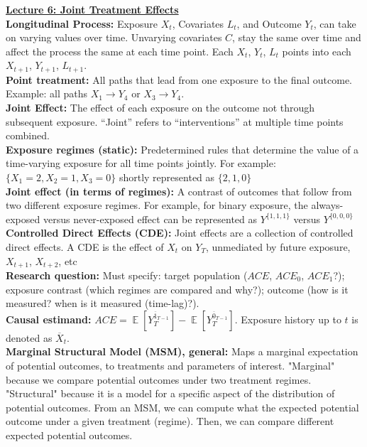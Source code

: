 \documentclass[a4paper,7pt,landscape]{extarticle}
\DeclareMathOperator*{\E}{\mathbb{E}} %
\begin{document}
\begin{multicols}{3}
\begin{boxA}
\underline{\textbf{Lecture 6: Joint Treatment Effects}}\\
\textbf{Longitudinal Process:} Exposure $X_t$, Covariates $L_t$, and Outcome $Y_t$, can take on varying values over time. Unvarying covariates $C$, stay the same over time and affect the process the same at each time point. Each $X_t$, $Y_t$, $L_t$ points into each $X_{t+1}$, $Y_{t+1}$, $L_{t+1}$.\\
\textbf{Point treatment:} All paths that lead from one exposure to the final outcome. Example: all paths $X_1 \rightarrow Y_4$ or $X_3 \rightarrow Y_4$.\\
\textbf{Joint Effect:} The effect of each exposure on the outcome not through subsequent exposure. “Joint” refers to “interventions” at multiple time points combined.\\
\textbf{Exposure regimes (static):} Predetermined rules that determine the value of a time-varying exposure for all time points jointly. For example: $\{X_1 = 2, X_2 = 1, X_3 = 0\}$ shortly represented as $\{2, 1, 0\}$\\
\textbf{Joint effect (in terms of regimes):} A contrast of outcomes that follow from two different exposure regimes. For example, for binary exposure, the always-exposed versus never-exposed effect can be represented as $Y^{\{1, 1, 1\}}$ versus $Y^{\{0, 0, 0\}}$\\
\textbf{Controlled Direct Effects (CDE):} Joint effects are a collection of controlled direct effects. A CDE is the effect of $X_t$ on $Y_T$,
unmediated by future exposure, $X_{t+1}$, $X_{t+2}$, etc\\
\textbf{Research question:} Must specify: target population ($ACE$, $ACE_0$, $ACE_1$?); exposure contrast (which regimes are compared and why?); outcome (how is it measured? when is it measured (time-lag)?).\\
\textbf{Causal estimand:} $ACE = \E [Y_T^{\overline{1}_{T-1}}] - \E [Y_T^{\overline{0}_{T-1}}]$. Exposure history up to $t$ is denoted as $\overline{X}_t$.\\
\textbf{Marginal Structural Model (MSM), general:} Maps a marginal expectation of potential outcomes, to treatments and parameters of interest. "Marginal" because we compare potential outcomes under two treatment regimes. "Structural" because it is a model for a specific aspect of the distribution of potential outcomes. From an MSM, we can compute what the expected potential outcome under a given treatment (regime). Then, we can compare different expected potential outcomes.\\

\end{boxA}
\end{multicols}
\end{document}
